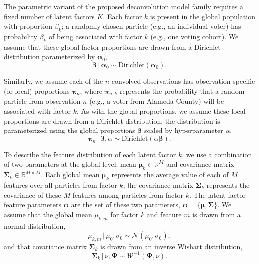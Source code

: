 \documentclass[twoside,11pt]{article}
\newcommand{\g}{\, | \,}
\newcommand{\R}{\mathbb{R}}
\begin{document}
The parametric variant of the proposed deconvolution model family requires a fixed number of latent factors $K$.  Each factor $k$ is present in the global population with proportion $\beta_k$; a randomly chosen particle (e.g., an individual voter) has probability $\beta_k$ of being associated with factor $k$ (e.g., one voting cohort).  We assume that these global factor proportions are drawn from a Dirichlet distribution parameterized by $\boldsymbol{\alpha}_0$,
\begin{equation}
\boldsymbol{\beta} \g \boldsymbol{\alpha}_0 \sim \mbox{Dirichlet}(\boldsymbol{\alpha}_0). \label{eq:parametric_beta}
\end{equation}

Similarly, we assume each of the $n$ convolved observations has observation-specific (or local) proportions $\boldsymbol{\pi}_n$, where $\boldsymbol{\pi}_{n,k}$ represents the probability that a random particle from observation $n$ (e.g., a voter from Alameda County) will be associated with factor $k$.  As with the global proportions, we assume these local proportions are drawn from a Dirichlet distribution; the distribution is parameterized using the global proportions $\boldsymbol{\beta}$ scaled by hyperparameter $\alpha$,
\begin{equation}
\boldsymbol{\pi}_n \g \boldsymbol{\beta}, \alpha \sim \mbox{Dirichlet}(\alpha \boldsymbol{\beta}).
\label{eq:parametric_pi}
\end{equation}

To describe the feature distribution of each latent factor $k$, we use a combination of two parameters at the global level: mean $\boldsymbol{\mu}_k \in \R^{M}$ and covariance matrix $\boldsymbol{\Sigma}_k \in \R^{M\times M}$.  Each global mean $\boldsymbol{\mu}_k$ represents the average value of each of $M$ features over all particles from factor $k$; the covariance matrix $\boldsymbol{\Sigma}_k$ represents the covariance of these $M$ features among particles from factor $k$.  The latent factor feature parameters $\boldsymbol{\phi} $ are the set of these two parameters, $\boldsymbol{\phi}=\{\boldsymbol{\mu}, \boldsymbol{\Sigma}\}$.
We assume that the global mean $\mu_{k,m}$ for factor $k$ and feature $m$ is drawn from a normal distribution,
\begin{equation}
\mu_{k,m} \g \mu_0, \sigma_0 \sim \mathcal{N}(\mu_0, \sigma_0), \label{eq:parametric_mu}
\end{equation}
and that covariance matrix $\boldsymbol{\Sigma}_k$ is drawn from an inverse Wishart distribution,
\begin{equation}\boldsymbol{\Sigma}_{k} \g \nu, \boldsymbol{\Psi} \sim \mathcal{W}^{-1}(\boldsymbol{\Psi}, \nu). \label{eq:parametric_Sigma}\end{equation}
\end{document}
